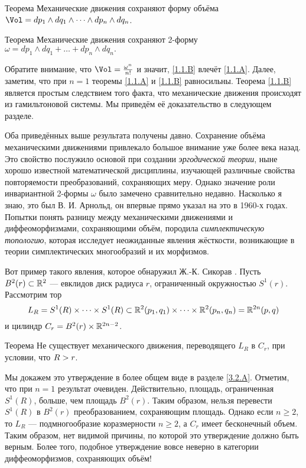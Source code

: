 \begin{thm}{Теорема}\label{1.1.A}
Механические движения сохраняют форму объёма 
$\Vol=dp_1\wedge dq_1\wedge\dots\wedge d p_n\wedge dq_n$.
\end{thm}

\begin{thm}{Теорема}\label{1.1.B}
Механические движения сохраняют 2-форму $\omega = dp_1 \wedge dq_1 +\dots
+ dp_n \wedge dq_n.$
\end{thm}

Обратите внимание, что $\Vol = \tfrac{\omega^n}{n!}$ и значит, \ref{1.1.B} влечёт \ref{1.1.A}.
Далее, заметим, что при $n = 1$ теоремы \ref{1.1.A} и \ref{1.1.B} равносильны.
Теорема \ref{1.1.B} является простым следствием того факта, что механические движения происходят из гамильтоновой системы.
Мы приведём её доказательство в следующем разделе.

Оба приведённых выше результата получены давно.
Сохранение объёма механическими движениями привлекало большое внимание уже более века назад.
Это свойство послужило основой при создании {}\emph{эргодической теории}, ныне хорошо известной математической дисциплины, изучающей различные свойства повторяемости преобразований, сохраняющих меру.
Однако значение роли инвариантной 2-формы $\omega$ было замечено сравнительно недавно.
Насколько я знаю, это был В. И. Арнольд, он впервые прямо указал на это в 1960-х годах.
Попытки понять разницу между механическими движениями и диффеоморфизмами, сохраняющими объём, породила {}\emph{симплектическую топологию}, которая исследует неожиданные явления жёсткости, возникающие в теории симплектических многообразий и их морфизмов.

Вот пример такого явления, которое обнаружил Ж.-К. Сикорав \cite{S1}.
Пусть $B^2(r) \subset \mathbb{R}^2$ — евклидов диск радиуса $r$, ограниченный окружностью $S^1(r)$.
Рассмотрим тор 
\[L_R = 
S^1 (R) \times\dots\times S^1(R) \subset \mathbb{R}^2 (p_1, q_1) \times\dots\times \mathbb{R}^2 (p_n, q_n) =\mathbb{R}^{2n} (p, q)\]
и цилиндр $C_r = B^2 (r) \times \mathbb{R}^{2n-2}$.

\begin{thm}{Теорема}\label{1.1.C}
Не существует механического движения, переводящего $L_R$ в $C_r$, при условии, что $R\z>r$.
\end{thm}

Мы докажем это утверждение в более общем виде в разделе \ref{3.2.A}.
Отметим, что при $n = 1$ результат очевиден.
Действительно, площадь, ограниченная $S^1 (R)$, больше, чем площадь $B^2 (r)$.
Таким образом, нельзя перевести $S^1(R)$ в $B^2(r)$ преобразованием, сохраняющим площадь.
Однако если $n \ge 2$, то $L_R$ — подмногообразие коразмерности $n \ge 2$, а $C_r$ имеет бесконечный объем.
Таким образом, нет видимой причины, по которой это утверждение должно быть верным.
Более того, подобное утверждение вовсе неверно в категории диффеоморфизмов, сохраняющих объём!


